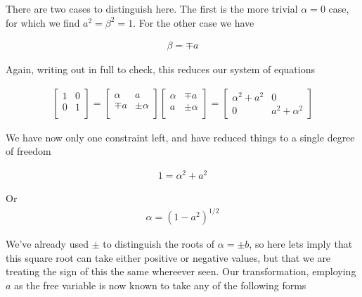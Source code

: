 There are two cases to distinguish here.  The first is the more trivial $\alpha = 0$ case, for which we find $a^2 = \beta^2 = 1$.  For the other case we have

\begin{align}\label{eqn:hamiltonian:voo13}
\beta = \mp a
\end{align}

Again, writing out in full to check, this reduces our system of equations

\begin{align}\label{eqn:hamiltonian:voo14}
\begin{bmatrix}
1 & 0 \\
0 & 1 \\
\end{bmatrix}
=
\begin{bmatrix}
\alpha & a     \\
\mp a  & \pm \alpha \\
\end{bmatrix}
\begin{bmatrix}
\alpha & \mp a \\
a      & \pm \alpha \\
\end{bmatrix}
= 
\begin{bmatrix}
\alpha^2 + a^2 & 0 \\
0 & a^2 + \alpha^2
\end{bmatrix}
\end{align}

We have now only one constraint left, and have reduced things to a single degree of freedom

\begin{align}\label{eqn:hamiltonian:voo15}
1 = \alpha^2 + a^2 
\end{align}

Or
\begin{align}\label{eqn:hamiltonian:voo16}
\alpha = (1 - a^2)^{1/2}
\end{align}

We've already used $\pm$ to distinguish the roots of $\alpha = \pm b$, so here lets imply that this square root can take either positive or negative values, but that we are treating the sign of this the same whereever seen.  Our transformation, employing $a$ as the free variable is now known to take any of the following forms

